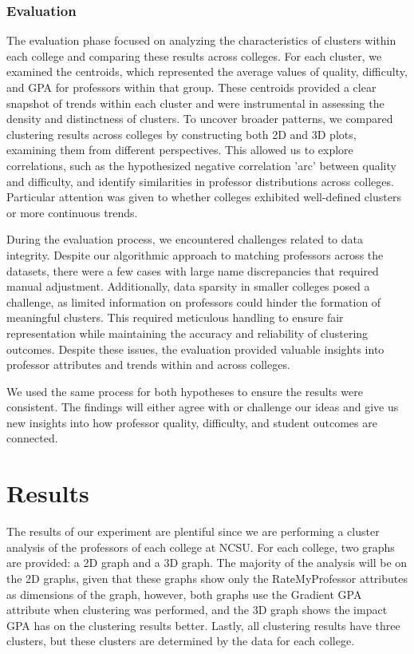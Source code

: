 \documentclass[sigconf,nonacm]{acmart}
\begin{document}
\subsubsection{Evaluation}
The evaluation phase focused on analyzing the characteristics of clusters within each college and comparing these results across colleges. For each cluster, we examined the centroids, which represented the average values of quality, difficulty, and GPA for professors within that group. These centroids provided a clear snapshot of trends within each cluster and were instrumental in assessing the density and distinctness of clusters. To uncover broader patterns, we compared clustering results across colleges by constructing both 2D and 3D plots, examining them from different perspectives. This allowed us to explore correlations, such as the hypothesized negative correlation 'arc' between quality and difficulty, and identify similarities in professor distributions across colleges. Particular attention was given to whether colleges exhibited well-defined clusters or more continuous trends.

During the evaluation process, we encountered challenges related to data integrity. Despite our algorithmic approach to matching professors across the datasets, there were a few cases with large name discrepancies that required manual adjustment. Additionally, data sparsity in smaller colleges posed a challenge, as limited information on professors could hinder the formation of meaningful clusters. This required meticulous handling to ensure fair representation while maintaining the accuracy and reliability of clustering outcomes. Despite these issues, the evaluation provided valuable insights into professor attributes and trends within and across colleges.


We used the same process for both hypotheses to ensure the results were consistent. The findings will either agree with or challenge our ideas and give us new insights into how professor quality, difficulty, and student outcomes are connected.


\section{Results}
The results of our experiment are plentiful since we are performing a cluster analysis of the professors of each college at NCSU. For each college, two graphs are provided: a 2D graph and a 3D graph. The majority of the analysis will be on the 2D graphs, given that these graphs show only the RateMyProfessor attributes as dimensions of the graph, however, both graphs use the Gradient GPA attribute when clustering was performed, and the 3D graph shows the impact GPA has on the clustering results better. Lastly, all clustering results have three clusters, but these clusters are determined by the data for each college.
\end{document}
